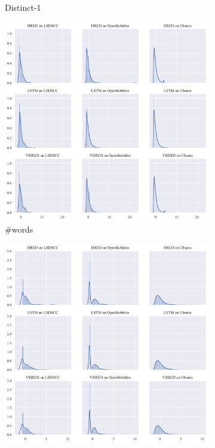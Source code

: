 \begin{figure}[H]
\begin{subfigure}{0.33\linewidth}
        \caption{Distinct-1}
    \end{subfigure}%
    \begin{subfigure}{0.33\linewidth}
        \centering
        \includegraphics[width=\linewidth]{figure/distplot_grid/utterance_len/plot.pdf}
        \caption{\#words}
    \end{subfigure}%
    \begin{subfigure}{0.33\linewidth}
        \centering
        \includegraphics[width=\linewidth]{figure/distplot_grid/rouge_l/plot.pdf}

\end{subfigure}
\end{figure}
